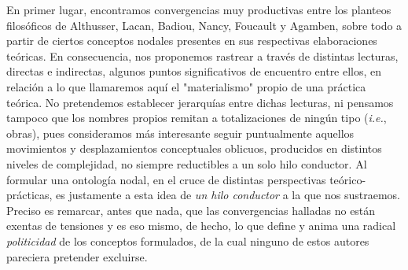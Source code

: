 \documentclass{book}
\begin{document}
En primer lugar, encontramos convergencias muy productivas entre los
planteos filosóficos de Althusser, Lacan, Badiou, Nancy, Foucault y
Agamben, sobre todo a partir de ciertos conceptos nodales presentes en
sus respectivas elaboraciones teóricas. En consecuencia, nos proponemos
rastrear a través de distintas lecturas, directas e indirectas, algunos
puntos significativos de encuentro entre ellos, en relación a lo que
llamaremos aquí el "materialismo" propio de una práctica teórica. No
pretendemos establecer jerarquías entre dichas lecturas, ni pensamos
tampoco que los nombres propios remitan a totalizaciones de ningún tipo
(\emph{i.e.}, obras), pues consideramos más interesante seguir
puntualmente aquellos movimientos y desplazamientos conceptuales
oblicuos, producidos en distintos niveles de complejidad, no siempre
reductibles a un solo hilo conductor. Al formular una ontología nodal,
en el cruce de distintas perspectivas teórico-prácticas, es justamente a
esta idea de \emph{un hilo conductor} a la que nos sustraemos. Preciso
es remarcar, antes que nada, que las convergencias halladas no están
exentas de tensiones y es eso mismo, de hecho, lo que define y anima una
radical \emph{politicidad} de los conceptos formulados, de la cual
ninguno de estos autores pareciera pretender excluirse.
\end{document}

